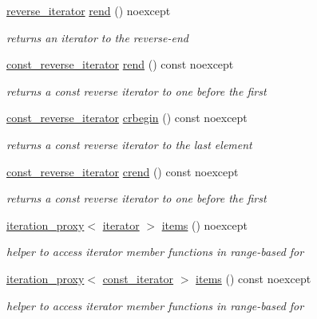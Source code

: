 \begin{DoxyCompactItemize}
\hyperlink{classnlohmann_1_1basic__json_ac223d5560c2b05a208c88de67376c5f2}{reverse\+\_\+iterator} \hyperlink{classnlohmann_1_1basic__json_ac77aed0925d447744676725ab0b6d535}{rend} () noexcept
\begin{DoxyCompactList}\small\item\em returns an iterator to the reverse-\/end \end{DoxyCompactList}\item 
\hyperlink{classnlohmann_1_1basic__json_a72be3c24bfa24f0993d6c11af03e7404}{const\+\_\+reverse\+\_\+iterator} \hyperlink{classnlohmann_1_1basic__json_a4f73d4cee67ea328d785979c22af0ae1}{rend} () const noexcept
\begin{DoxyCompactList}\small\item\em returns a const reverse iterator to one before the first \end{DoxyCompactList}\item 
\hyperlink{classnlohmann_1_1basic__json_a72be3c24bfa24f0993d6c11af03e7404}{const\+\_\+reverse\+\_\+iterator} \hyperlink{classnlohmann_1_1basic__json_a1e0769d22d54573f294da0e5c6abc9de}{crbegin} () const noexcept
\begin{DoxyCompactList}\small\item\em returns a const reverse iterator to the last element \end{DoxyCompactList}\item 
\hyperlink{classnlohmann_1_1basic__json_a72be3c24bfa24f0993d6c11af03e7404}{const\+\_\+reverse\+\_\+iterator} \hyperlink{classnlohmann_1_1basic__json_a5795b029dbf28e0cb2c7a439ec5d0a88}{crend} () const noexcept
\begin{DoxyCompactList}\small\item\em returns a const reverse iterator to one before the first \end{DoxyCompactList}\item 
\hyperlink{classnlohmann_1_1basic__json_afb49d897bc58d6678f4471925bbfbb01}{iteration\+\_\+proxy}$<$ \hyperlink{classnlohmann_1_1basic__json_a099316232c76c034030a38faa6e34dca}{iterator} $>$ \hyperlink{classnlohmann_1_1basic__json_afe3e137ace692efa08590d8df40f58dd}{items} () noexcept
\begin{DoxyCompactList}\small\item\em helper to access iterator member functions in range-\/based for \end{DoxyCompactList}\item 
\hyperlink{classnlohmann_1_1basic__json_afb49d897bc58d6678f4471925bbfbb01}{iteration\+\_\+proxy}$<$ \hyperlink{classnlohmann_1_1basic__json_a41a70cf9993951836d129bb1c2b3126a}{const\+\_\+iterator} $>$ \hyperlink{classnlohmann_1_1basic__json_a71dd7adfca43660c10e6624f4b5c290c}{items} () const noexcept
\begin{DoxyCompactList}\small\item\em helper to access iterator member functions in range-\/based for \end{DoxyCompactList}\end{DoxyCompactItemize}
